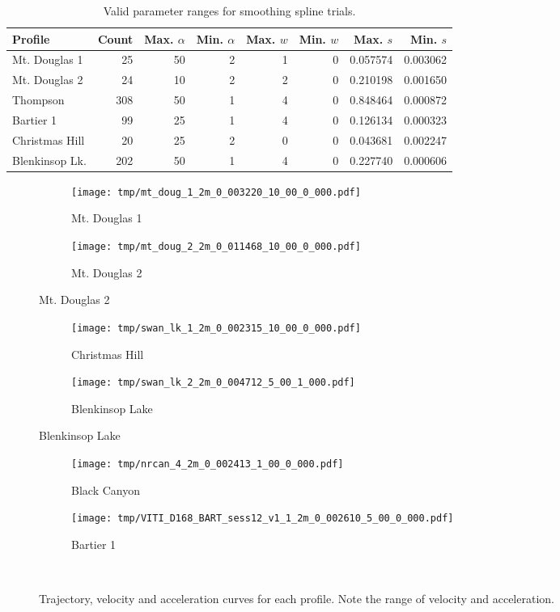 \documentclass[doc]{apa6}
\begin{document}
\begin{table}
\caption{Valid parameter ranges for smoothing spline trials.}
\label{table:arg_results}
\begin{tabular}{l | r || r | r | r | r | r | r} 
Profile & Count & Max. $\alpha$ & Min. $\alpha$ & Max. $w$ & Min. $w$ & Max. $s$ & Min. $s$ \\
\hline
Mt. Douglas 1  & 25  & 50 & 2 & 1 & 0 & 0.057574 & 0.003062 \\
Mt. Douglas 2  & 24  & 10 & 2 & 2 & 0 & 0.210198 & 0.001650 \\
Thompson       & 308 & 50 & 1 & 4 & 0 & 0.848464 & 0.000872 \\
Bartier 1      & 99  & 25 & 1 & 4 & 0 & 0.126134 & 0.000323 \\
Christmas Hill & 20  & 25 & 2 & 0 & 0 & 0.043681 & 0.002247 \\
Blenkinsop Lk. & 202 & 50 & 1 & 4 & 0 & 0.227740 & 0.000606\\
\end{tabular}
\end{table}

\begin{figure} %
\begin{subfigure}[b]{\textwidth}
\texttt{[image: tmp/mt\_doug\_1\_2m\_0\_003220\_10\_00\_0\_000.pdf]} 
\caption{Mt. Douglas 1} \label{subfig:mt_doug_1}
\end{subfigure}
\begin{subfigure}[b]{\textwidth}
\texttt{[image: tmp/mt\_doug\_2\_2m\_0\_011468\_10\_00\_0\_000.pdf]} 
\caption{Mt. Douglas 2} \label{subfig:mt_doug_2}
\end{subfigure}
\end{figure}

\begin{figure}\ContinuedFloat
\begin{subfigure}[b]{\textwidth}
\texttt{[image: tmp/swan\_lk\_1\_2m\_0\_002315\_10\_00\_0\_000.pdf]} 
\caption{Christmas Hill} \label{subfig:swan_1}
\end{subfigure}
\begin{subfigure}[b]{\textwidth}
\texttt{[image: tmp/swan\_lk\_2\_2m\_0\_004712\_5\_00\_1\_000.pdf]} 
\caption{Blenkinsop Lake} \label{subfig:swan_2}
\end{subfigure}
\end{figure}

\begin{figure}\ContinuedFloat
\begin{subfigure}[b]{\textwidth}
\texttt{[image: tmp/nrcan\_4\_2m\_0\_002413\_1\_00\_0\_000.pdf]} 
\caption{Black Canyon} \label{subfig:thompson}
\end{subfigure}
\begin{subfigure}[b]{\textwidth}
\texttt{[image: tmp/VITI\_D168\_BART\_sess12\_v1\_1\_2m\_0\_002610\_5\_00\_0\_000.pdf]} 
\caption{Bartier 1} \label{subfig:bartier_1}
\end{subfigure}
~
\caption{Trajectory, velocity and acceleration curves for each profile. Note the range of velocity and acceleration.}
\label{fig:profiles}
\end{figure}
\end{document}
